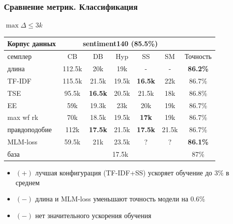 \documentclass{beamer}
\begin{document}
\begin{frame}
	\frametitle{Сравнение метрик. Классификация}
	$\max\Delta \le 3k$
	\begin{table}
		\begin{tabular}{l|ccccc|c}
			Корпус данных & \multicolumn{5}{c}{sentiment140 (85.5\%)}\\
			\hline
			семплер & CB & DB & Hyp & SS & SM & Точность\\
			\hline
			длина & 112.5k & 20k & 19k & - & - & {\bf 86.2\%} \\
			TF-IDF & 115.5k & 21.5k & 19.5k & {\bf 16.5k} & 22k & 86.7\% \\
			TSE & 95.5k & {\bf 16.5k} & 20.5k & 21.5k & 18k & 86.8\% \\
			EE & 59k & 19.3k & 23k & 20k & 19k & 86.7\% \\
			max wf rk & 70k & 18.5k & 19.5k & {\bf 17k} & 19k & 86.7\% \\
			правдоподобие & 112k & {\bf 17.5k} & 21.5k & {\bf 17.5k} & 21.5k & 86.7\% \\
			MLM-loss & 59.5k & 21k & 23.5k & ? & ? & {\bf 86.1\%} \\
			\hline
			база & \multicolumn{5}{c}{17.5k} & 87\%
		\end{tabular}
	\end{table}
	\begin{itemize}
		\item {\bf\color{green}$(+)$} лучшая конфигурация (TF-IDF+SS) ускоряет обучение до 3\% в среднем
		\item {\bf\color{red}$(-)$} длина и MLM-loss уменьшают точность модели на 0.6\%
		\item {\bf\color{red}$(-)$} нет значительного ускорения обучения
	\end{itemize}
\end{frame}
\end{document}
